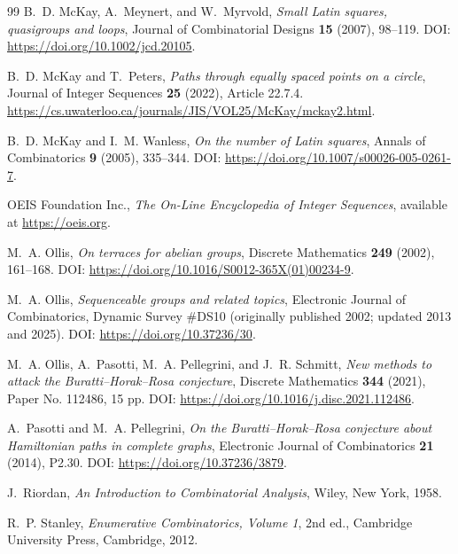 \documentclass[11pt,a4paper]{amsart}
\newcommand{\1}{\mathbf{1}}
\begin{document}
\begin{thebibliography}{99}
B.~D. McKay, A.~Meynert, and W.~Myrvold,
\newblock \emph{Small Latin squares, quasigroups and loops},
\newblock Journal of Combinatorial Designs \textbf{15} (2007), 98--119.
\newblock DOI: \url{https://doi.org/10.1002/jcd.20105}.

B.~D. McKay and T.~Peters,
\newblock \emph{Paths through equally spaced points on a circle},
\newblock Journal of Integer Sequences \textbf{25} (2022), Article 22.7.4.
\newblock \url{https://cs.uwaterloo.ca/journals/JIS/VOL25/McKay/mckay2.html}.

B.~D. McKay and I.~M. Wanless,
\newblock \emph{On the number of Latin squares},
\newblock Annals of Combinatorics \textbf{9} (2005), 335--344.
\newblock DOI: \url{https://doi.org/10.1007/s00026-005-0261-7}.

OEIS Foundation Inc.,
\newblock \emph{The On-Line Encyclopedia of Integer Sequences},
\newblock available at \url{https://oeis.org}.

M.~A. Ollis,
\newblock \emph{On terraces for abelian groups},
\newblock Discrete Mathematics \textbf{249} (2002), 161--168.
\newblock DOI: \url{https://doi.org/10.1016/S0012-365X(01)00234-9}.

M.~A. Ollis,
\newblock \emph{Sequenceable groups and related topics},
\newblock Electronic Journal of Combinatorics, Dynamic Survey \#DS10 (originally published 2002; updated 2013 and 2025).
\newblock DOI: \url{https://doi.org/10.37236/30}.

M.~A. Ollis, A.~Pasotti, M.~A. Pellegrini, and J.~R. Schmitt,
\newblock \emph{New methods to attack the Buratti--Horak--Rosa conjecture},
\newblock Discrete Mathematics \textbf{344} (2021), Paper No. 112486, 15 pp.
\newblock DOI: \url{https://doi.org/10.1016/j.disc.2021.112486}.

A.~Pasotti and M.~A. Pellegrini,
\newblock \emph{On the Buratti--Horak--Rosa conjecture about Hamiltonian paths in complete graphs},
\newblock Electronic Journal of Combinatorics \textbf{21} (2014), P2.30.
\newblock DOI: \url{https://doi.org/10.37236/3879}.

J.~Riordan,
\newblock \emph{An Introduction to Combinatorial Analysis},
\newblock Wiley, New York, 1958.

R.~P. Stanley,
\newblock \emph{Enumerative Combinatorics, Volume 1}, 2nd ed.,
\newblock Cambridge University Press, Cambridge, 2012.


\end{thebibliography}
\end{document}
